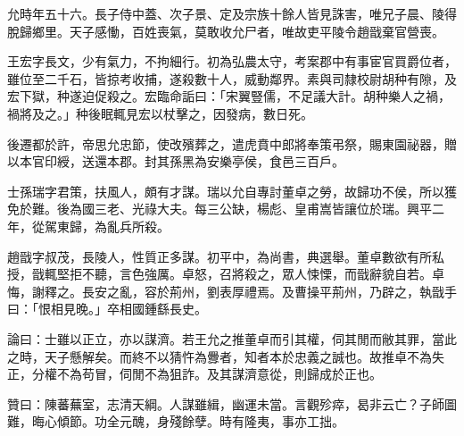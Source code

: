 \begin{pinyinscope}
允時年五十六。長子侍中蓋、次子景、定及宗族十餘人皆見誅害，唯兄子晨、陵得脫歸鄉里。天子感慟，百姓喪氣，莫敢收允尸者，唯故吏平陵令趙戩棄官營喪。

王宏字長文，少有氣力，不拘細行。初為弘農太守，考案郡中有事宦官買爵位者，雖位至二千石，皆掠考收捕，遂殺數十人，威動鄰界。素與司隸校尉胡种有隙，及宏下獄，种遂迫促殺之。宏臨命詬曰：「宋翼豎儒，不足議大計。胡种樂人之禍，禍將及之。」种後眠輒見宏以杖擊之，因發病，數日死。

後遷都於許，帝思允忠節，使改殯葬之，遣虎賁中郎將奉策弔祭，賜東園祕器，贈以本官印綬，送還本郡。封其孫黑為安樂亭侯，食邑三百戶。

士孫瑞字君策，扶風人，頗有才謀。瑞以允自專討董卓之勞，故歸功不侯，所以獲免於難。後為國三老、光祿大夫。每三公缺，楊彪、皇甫嵩皆讓位於瑞。興平二年，從駕東歸，為亂兵所殺。

趙戩字叔茂，長陵人，性質正多謀。初平中，為尚書，典選舉。董卓數欲有所私授，戩輒堅拒不聽，言色強厲。卓怒，召將殺之，眾人悚慄，而戩辭貌自若。卓悔，謝釋之。長安之亂，容於荊州，劉表厚禮焉。及曹操平荊州，乃辟之，執戩手曰：「恨相見晚。」卒相國鍾繇長史。

論曰：士雖以正立，亦以謀濟。若王允之推董卓而引其權，伺其閒而敝其罪，當此之時，天子懸解矣。而終不以猜忤為釁者，知者本於忠義之誠也。故推卓不為失正，分權不為苟冒，伺閒不為狙詐。及其謀濟意從，則歸成於正也。

贊曰：陳蕃蕪室，志清天綱。人謀雖緝，幽運未當。言觀殄瘁，曷非云亡？子師圖難，晦心傾節。功全元醜，身殘餘孽。時有隆夷，事亦工拙。


\end{pinyinscope}